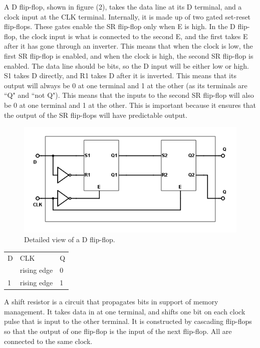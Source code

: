 \documentclass[twocolumn, amsmath]{revtex4}
\begin{document}
A D flip-flop, shown in figure (2), takes the data line at its D terminal, and a clock input at the CLK terminal. Internally, it is made up of two gated set-reset flip-flops. These gates enable the SR flip-flop only when E is high. In the D flip-flop, the clock input is what is connected to the second E, and the first takes E after it has gone through an inverter. This means that when the clock is low, the first SR flip-flop is enabled, and when the clock is high, the second SR flip-flop is enabled. 
The data line should be bits, so the D input will be either low or high. S1 takes D directly, and R1 takes D after it is inverted. This means that its output will always be 0 at one terminal and 1 at the other (as its terminals are ``Q" and ``not Q"). This means that the inputs to the second SR flip-flop will also be 0 at one terminal and 1 at the other. This is important because it ensures that the output of the SR flip-flops will have predictable output.

\begin{figure}[h]
    \includegraphics[scale=0.45]{dflipflop}  
    \caption{Detailed view of a D flip-flop.}
\end{figure}

\begin{center}
	\begin{ruledtabular}
    \begin{tabular}{ l l l}
	D & CLK & Q\\ \colrule
	0 & rising edge & 0 \\
	1 & rising edge & 1 \\
\end{tabular}
    \end{ruledtabular}
\end{center}

A shift resistor is a circuit that propagates bits in support of memory management. It takes data in at one terminal, and shifts one bit on each clock pulse that is input to the other terminal. It is constructed by cascading flip-flops so that the output of one flip-flop is the input of the next flip-flop. All are connected to the same clock. 
\end{document}

